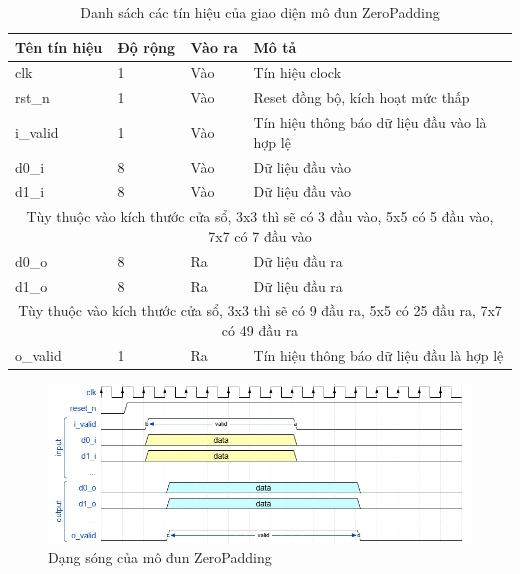 \begin{table}[h]
    \centering
    \renewcommand{\arraystretch}{1.3} %
    \begin{tabular}{|p{3cm} p{2cm} p{2cm} p{8cm}|}
        \hline
        \rowcolor{gray!30}
        \textbf{Tên tín hiệu} & \textbf{Độ rộng} & \textbf{Vào ra} & \textbf{Mô tả} \\
        \hline
        clk & 1 & Vào & Tín hiệu clock \\
        \hline
        rst\_n & 1 & Vào & Reset đồng bộ, kích hoạt mức thấp \\
        \hline
        i\_valid & 1 & Vào & Tín hiệu thông báo dữ liệu đầu vào là hợp lệ
        \\ \hline
        d0\_i & 8 & Vào & Dữ liệu đầu vào
        \\ \hline
        d1\_i & 8 & Vào & Dữ liệu đầu vào
        \\
        \hline
        \multicolumn{4}{|c|}{Tùy thuộc vào kích thước cửa sổ, 3x3 thì sẽ có 3 đầu vào, 5x5 có 5 đầu vào, 7x7 có 7 đầu vào}
        \\ \hline
        d0\_o & 8 & Ra & Dữ liệu đầu ra
        \\ \hline
        d1\_o & 8 & Ra & Dữ liệu đầu ra
        \\ \hline
                \multicolumn{4}{|c|}{Tùy thuộc vào kích thước cửa sổ, 3x3 thì sẽ có 9 đầu ra, 5x5 có 25 đầu ra, 7x7 có 49 đầu ra}
        \\ \hline
        o\_valid & 1& Ra & Tín hiệu thông báo dữ liệu đầu là hợp lệ
        \\ \hline
    \end{tabular}
    \caption{Danh sách các tín hiệu của giao diện mô đun ZeroPadding}
    \label{tab:signalListZeroPadding}
\end{table}

\begin{figure}[!ht]
    \centering
    \includegraphics[width=\linewidth]{figures/zeroPadding.png}
    \caption{Dạng sóng của mô đun ZeroPadding}
    \label{fig:zeroPadding}
\end{figure}


